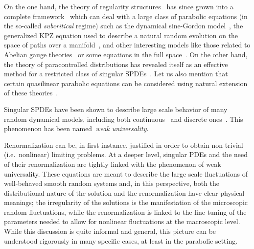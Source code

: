 \documentclass[%
11pt,  reqno]{amsart}
\newcommand{\1}{\hspace{0.2mm}\text{I}\hspace{0.2mm}}
\numberwithin{equation}{section}
\numberwithin{theorem}{section}
\begin{document}
On the one hand, the theory of regularity structures~\cite{Hairer, friz_course_2014, MR3728488} has since grown into a complete framework~\cite{bruned_algebraic_2016, chandra_analytic_2016, bruned_renormalising_2017, MR3855740} which can deal with a large class of parabolic equations (in the so-called \emph{subcritical} regime) 
such as  the dynamical sine-Gordon model~\cite{hairer_dynamical_2016, chandra_dynamical_2018}, the generalized KPZ equation used to describe a natural random evolution on the space of paths over a manifold~\cite{hairer_motion_2016}, and other interesting models like those related to Abelian gauge theories~\cite{shen_stochastic_2018} or some equations in the full space~\cite{MR3779690}.
On the other hand, the theory of paracontrolled distributions 
has revealed itself as an effective method for a restricted class of singular SPDEs~\cite{CC, GP1, allez_continuous_2015, zhu_three_dimensional_2015, 
hoshino_2016,
bailleul_higher_2016,  bailleul_quasilinear_2016, MW1, funaki_2017, hoshino_2017, hoshino_2017b, GH18, perkowski_kpz_2018, MR3785598}. Let us also mention that 
 certain quasilinear parabolic equations can 
  be considered using natural extension of these theories~\cite{otto_quasilinear_2016, furlan_paracontrolled_2016, gerencser_solution_2017}.

Singular SPDEs have been shown to describe large scale behavior of many random dynamical models, including both  continuous~\cite{HQ, MR3737909, MR3772400, shen_weak_2017, furlan_weak_2018, hairer_large_scale_2018} and discrete ones~\cite{MW2, cannizzaro_space_time_2016, shen_glauber_2016, martin_paracontrolled_2017, hairer_discretisations_2018, matetski_martingale_driven_2018}. 
This phenomenon has been named~\emph{weak universality}.

Renormalization can be, in first instance,  justified in order to obtain non-trivial (i.e.~nonlinear) limiting problems. 
At a deeper level, 
 singular PDEs and the need of their renormalization are tightly linked with the phenomenon of weak universality. 
 These equations are meant to describe the large scale fluctuations of well-behaved smooth random systems
  and, in this perspective, both the distributional nature of the solution and the renormalization have clear physical meanings; the irregularity of the solutions is the manifestation of the microscopic random fluctuations, while the renormalization is linked to the fine tuning of the parameters needed to allow for nonlinear fluctuations at the macroscopic level. While this discussion is quite informal and general,  this picture can be understood rigorously in many specific cases, at least in the parabolic setting. 
\end{document}
